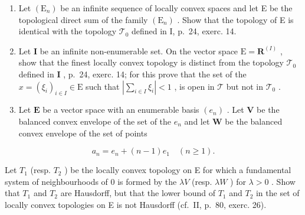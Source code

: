 \begin{enumerate}
\def\labelenumi{\arabic{enumi})}
\setcounter{enumi}{9}
\item
  Let \((\mathrm{E}_n)\) be an infinite sequence of locally convex spaces and let E be the topological direct sum of the family \((\mathrm{E}_n)\) . Show that the topology of E is identical with the topology \(\mathcal{T}_0\) defined in I, p.~24, exerc. 14.
\item
  Let \(\mathbf{I}\) be an infinite non-enumerable set. On the vector space \(\mathrm{E} = \mathbf{R}^{(I)}\) , show that the finest locally convex topology is distinct from the topology \(\mathcal{T}_0\) defined in \(\mathbf{I}\) , p.~24, exerc. 14; for this prove that the set of the \(x = (\xi_{i})_{i\in I} \in \mathrm{E}\) such that \(|\sum_{i\in I} \xi_i| < 1\) , is open in \(\mathcal{T}\) but not in \(\mathcal{T}_0\) .
\item
  Let \(\mathbf{E}\) be a vector space with an enumerable basis \((e_n)\) . Let \(\mathbf{V}\) be the balanced convex envelope of the set of the \(e_n\) and let \(\mathbf{W}\) be the balanced convex envelope of the set of points
\end{enumerate}

\[
a _ {n} = e _ {n} + (n - 1) e _ {1} \quad (n \geqslant 1).
\]

Let \(T_{1}\) (resp. \(T_{2}\) ) be the locally convex topology on E for which a fundamental system of neighbourhoods of 0 is formed by the \(\lambda V\) (resp. \(\lambda W\) ) for \(\lambda > 0\) . Show that \(T_{1}\) and \(T_{2}\) are Hausdorff, but that the lower bound of \(T_{1}\) and \(T_{2}\) in the set of locally convex topologies on E is not Hausdorff (cf.~II, p.~80, exerc. 26).

